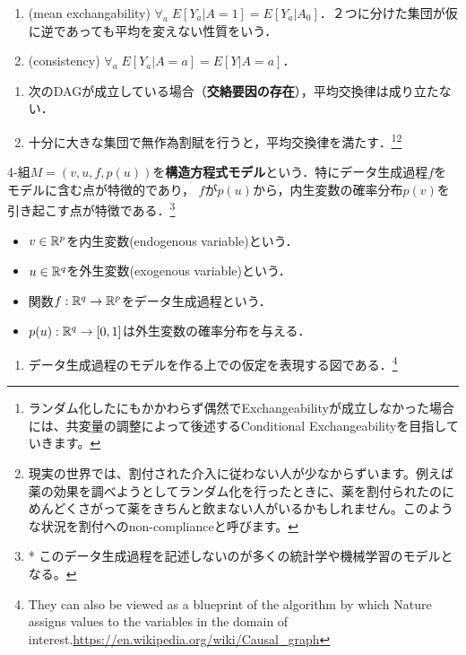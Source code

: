 \documentclass[uplatex,dvipdfmx]{jsreport}
\begin{document}
\begin{axiom}\mbox{}
    \begin{enumerate}
        \item (mean exchangability) $\forall_{a}\;E[Y_a|A=1]=E[Y_a|A_0]$．２つに分けた集団が仮に逆であっても平均を変えない性質をいう．
        \item (consistency) $\forall_{a}\;E[Y_a|A=a]=E[Y|A=a]$．
    \end{enumerate}
\end{axiom}
\begin{example}\mbox{}
    \begin{enumerate}
        \item 次のDAGが成立している場合（\textbf{交絡要因の存在}），平均交換律は成り立たない．
        \item 十分に大きな集団で無作為割賦を行うと，平均交換律を満たす．\footnote{ランダム化したにもかかわらず偶然でExchangeabilityが成立しなかった場合には、共変量の調整によって後述するConditional Exchangeabilityを目指していきます。\cite{芝孝一郎}}\footnote{現実の世界では、割付された介入に従わない人が少なからずいます。例えば薬の効果を調べようとしてランダム化を行ったときに、薬を割付られたのにめんどくさがって薬をきちんと飲まない人がいるかもしれません。このような状況を割付へのnon-complianceと呼びます。\cite{芝孝一郎}}
    \end{enumerate}
\end{example}

\begin{definition}
    4-組$M=(v,u,f,p(u))$を\textbf{構造方程式モデル}という．特にデータ生成過程$f$をモデルに含む点が特徴的であり，
    $f$が$p(u)$から，内生変数の確率分布$p(v)$を引き起こす点が特徴である．\footnote{    * このデータ生成過程を記述しないのが多くの統計学や機械学習のモデルとなる。\cite{清水昌平}}
    \begin{itemize}
        \item $v\in\mathbb{R}^p$を内生変数(endogenous variable)という．
        \item $u\in\mathbb{R}^q$を外生変数(exogenous variable)という．
        \item 関数$f:\mathbb{R}^q\to\mathbb{R}^p$をデータ生成過程という．
        \item $p(u):\mathbb{R}^q\to[0,1]$は外生変数の確率分布を与える．
    \end{itemize}
\end{definition}

\begin{definition}\mbox{}
    \begin{enumerate}
        \item データ生成過程のモデルを作る上での仮定を表現する図である．\footnote{They can also be viewed as a blueprint of the algorithm by which Nature assigns values to the variables in the domain of interest.\url{https://en.wikipedia.org/wiki/Causal_graph}}
    \end{enumerate}
\end{definition}
\end{document}
